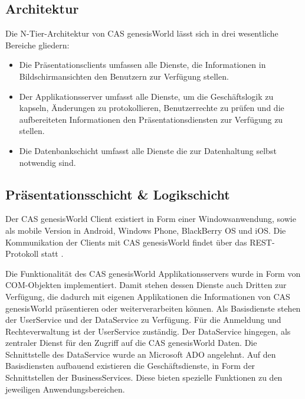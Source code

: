 \subsection{Architektur}

Die N-Tier-Architektur von CAS genesisWorld lässt sich in drei wesentliche Bereiche gliedern:

\begin{itemize}

	\item Die Präsentationsclients umfassen alle Dienste, die Informationen in Bildschirmansichten den Benutzern zur Verfügung stellen.
	
	\item Der Applikationsserver umfasst alle Dienste, um die Geschäftslogik zu kapseln, Änderungen zu protokollieren, Benutzerrechte zu prüfen und die aufbereiteten Informationen den Präsentationsdiensten zur Verfügung zu stellen.
	
	\item Die Datenbankschicht umfasst alle Dienste die zur Datenhaltung selbst notwendig sind.
\end{itemize}


\subsection{Präsentationsschicht \& Logikschicht}

Der CAS genesisWorld Client existiert in Form einer Windowsanwendung, sowie als mobile Version in Android, Windows Phone, BlackBerry OS und iOS. Die Kommunikation der Clients mit CAS genesisWorld findet über das REST-Protokoll statt \cite{cas2013a}.

Die Funktionalität des CAS genesisWorld Applikationsservers wurde in Form von COM-Objekten implementiert. Damit stehen dessen Dienste auch Dritten zur Verfügung, die dadurch mit eigenen Applikationen die Informationen von CAS genesisWorld präsentieren oder weiterverarbeiten können. Als Basisdienste stehen der UserService und der DataService zu Verfügung. Für die Anmeldung und Rechteverwaltung ist der UserService zuständig. Der DataService hingegen, als zentraler Dienst für den Zugriff auf die CAS genesisWorld Daten. Die Schnittstelle des DataService wurde an Microsoft ADO angelehnt. Auf den Basisdiensten aufbauend existieren die Geschäftsdienste, in Form der Schnittstellen der BusinessServices. Diese bieten spezielle Funktionen zu den jeweiligen Anwendungsbereichen.

